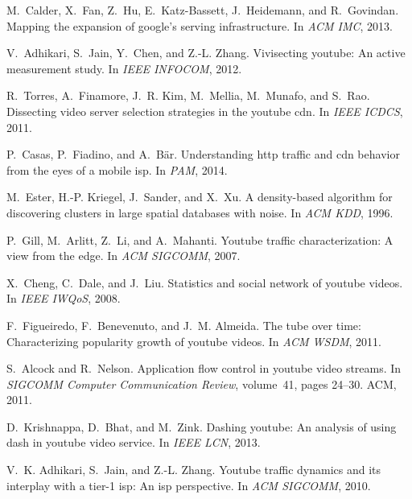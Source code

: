 \documentclass{acm_proc_article-sp}
\begin{document}

\begin{thebibliography}{10}

M.~Calder, X.~Fan, Z.~Hu, E.~Katz-Bassett, J.~Heidemann, and R.~Govindan.
\newblock Mapping the expansion of google's serving infrastructure.
\newblock In {\em ACM IMC}, 2013.

V.~Adhikari, S.~Jain, Y.~Chen, and Z.-L. Zhang.
\newblock Vivisecting youtube: An active measurement study.
\newblock In {\em IEEE INFOCOM}, 2012.

R.~Torres, A.~Finamore, J.~R. Kim, M.~Mellia, M.~Munafo, and S.~Rao.
\newblock Dissecting video server selection strategies in the youtube cdn.
\newblock In {\em IEEE ICDCS}, 2011.

P.~Casas, P.~Fiadino, and A.~B{\"a}r.
\newblock Understanding http traffic and cdn behavior from the eyes of a mobile
  isp.
\newblock In {\em PAM}, 2014.

M.~Ester, H.-P. Kriegel, J.~Sander, and X.~Xu.
\newblock A density-based algorithm for discovering clusters in large spatial
  databases with noise.
\newblock In {\em ACM KDD}, 1996.

P.~Gill, M.~Arlitt, Z.~Li, and A.~Mahanti.
\newblock Youtube traffic characterization: A view from the edge.
\newblock In {\em ACM SIGCOMM}, 2007.

X.~Cheng, C.~Dale, and J.~Liu.
\newblock Statistics and social network of youtube videos.
\newblock In {\em IEEE IWQoS}, 2008.

F.~Figueiredo, F.~Benevenuto, and J.~M. Almeida.
\newblock The tube over time: Characterizing popularity growth of youtube
  videos.
\newblock In {\em ACM WSDM}, 2011.

S.~Alcock and R.~Nelson.
\newblock Application flow control in youtube video streams.
\newblock In {\em SIGCOMM Computer Communication Review}, volume~41, pages
  24--30. ACM, 2011.

D.~Krishnappa, D.~Bhat, and M.~Zink.
\newblock Dashing youtube: An analysis of using dash in youtube video service.
\newblock In {\em IEEE LCN}, 2013.

V.~K. Adhikari, S.~Jain, and Z.-L. Zhang.
\newblock Youtube traffic dynamics and its interplay with a tier-1 isp: An isp
  perspective.
\newblock In {\em ACM SIGCOMM}, 2010.


\end{thebibliography}
\end{document}
